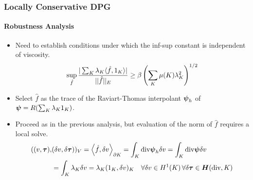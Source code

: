 \documentclass[18pt,xcolor=table]{beamer}
\begin{document}
\begin{frame}
\frametitle{Locally Conservative DPG}
\framesubtitle{Robustness Analysis}
\begin{itemize}
    \item Need to establish conditions under which the inf-sup constant is
      independent of viscosity.
      \begin{equation*}
        \sup_{\hat{f}} \frac{| \sum_K \lambda_K \langle \hat{f},1_K \rangle |}{|| \hat{f} ||_E}
        \geq  \beta \left( \sum_K \mu(K) \lambda_K^2 \right)^{1/2}
      \end{equation*}
    \item Select $\hat f$ as the trace of the Raviart-Thomas interpolant
      $\boldsymbol\psi_h$ of $\boldsymbol\psi=R(\sum_K\lambda_K1_K)$.
    \item Proceed as in the previous analysis, but evaluation of the norm of
      $\hat f$ requires a local solve.
      \begin{align*}
        ( (v,\boldsymbol\tau),&(\delta v,\delta\boldsymbol\tau) )_V
        =\left\langle \hat f,\delta v \right\rangle_{\partial K}
        =\int_K\text{div}\boldsymbol\psi_h\delta v
        =\int_K\text{div}\boldsymbol\psi\delta v\\
        &=\int_K\lambda_K\delta v=\lambda_K(1_K,\delta v)_K
        \quad\forall\delta v\in
        H^1(K)\,\forall\delta\boldsymbol\tau\in\mbox{\boldmath $H$}(\text{div},K)
      \end{align*}
\end{itemize}
\end{frame}

\end{document}
